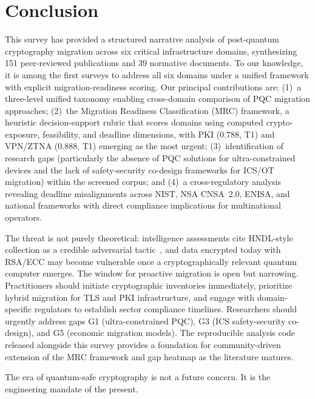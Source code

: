 \documentclass[journal]{IEEEtran}
\begin{document}
\FloatBarrier
\section{Conclusion}
\label{sec:conclusion}

This survey has provided a structured narrative analysis of post-quantum
cryptography migration across six critical infrastructure domains, synthesizing
151 peer-reviewed publications and 39 normative documents.
To our knowledge, it is among the first surveys to address all six domains under
a unified framework with explicit migration-readiness scoring.
Our principal contributions are: (1)~a three-level unified taxonomy enabling
cross-domain comparison of PQC migration approaches; (2)~the Migration Readiness
Classification (MRC) framework, a heuristic decision-support rubric that scores
domains using computed crypto-exposure, feasibility, and deadline dimensions,
with PKI (0.788, T1) and VPN/ZTNA (0.888, T1) emerging as the most urgent;
(3)~identification of research gaps (particularly the absence of PQC solutions for
ultra-constrained devices and the lack of safety-security co-design frameworks
for ICS/OT migration) within the screened corpus; and (4)~a cross-regulatory
analysis revealing deadline misalignments across NIST, NSA CNSA~2.0, ENISA, and
national frameworks with direct compliance implications for multinational operators.

The threat is not purely theoretical: intelligence assessments cite HNDL-style
collection as a credible adversarial tactic~\cite{odni2023atr}, and data
encrypted today with RSA/ECC may become vulnerable once a cryptographically
relevant quantum computer emerges. The window for proactive migration is open
but narrowing. Practitioners should initiate cryptographic inventories immediately,
prioritize hybrid migration for TLS and PKI infrastructure, and engage with
domain-specific regulators to establish sector compliance timelines. Researchers
should urgently address gaps G1 (ultra-constrained PQC), G3 (ICS safety-security
co-design), and G5 (economic migration models). The reproducible analysis code
released alongside this survey provides a foundation for community-driven
extension of the MRC framework and gap heatmap as the literature matures.

The era of quantum-safe cryptography is not a future concern. It is the
engineering mandate of the present.
\end{document}
